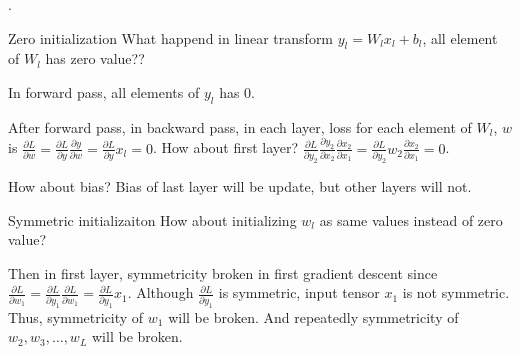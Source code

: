\documentclass[8pt]{beamer}
\begin{document}
\begin{frame}{.}
    \begin{block}{Zero initialization}
        What happend in linear transform $y_{l} = W_l x_l + b_l$, all element of $W_l$ has zero value??
    \end{block}

    In forward pass, all elements of $y_l$ has $0$.

    After forward pass, in backward pass, in each layer, loss for each element of $W_l$, $w$ is $\frac{\partial L}{\partial w} = \frac{\partial L}{\partial y} \frac{\partial y}{\partial w} = \frac{\partial L}{\partial y} x_l = 0$. How about first layer? $\frac{\partial L}{\partial y_2} \frac{\partial y_2}{\partial x_2} \frac{\partial x_2}{\partial x_1} = \frac{\partial L}{\partial y_2} w_2 \frac{\partial x_2}{\partial x_1} = 0$.

    How about bias? Bias of last layer will be update, but other layers will not.

    \begin{block}{Symmetric initializaiton}
        How about initializing $w_l$ as same values instead of zero value?
    \end{block}

    Then in first layer, symmetricity broken in first gradient descent since $\frac{\partial L}{\partial w_1} = \frac{\partial L}{\partial y_1} \frac{\partial L}{\partial w_1} = \frac{\partial L}{\partial y_1} x_1$. Although $\frac{\partial L}{\partial y_1}$ is symmetric, input tensor $x_1$ is not symmetric. Thus, symmetricity of $w_1$ will be broken. And repeatedly symmetricity of $w_2, w_3, \dots, w_L$ will be broken. 

\end{frame}
\end{document}
